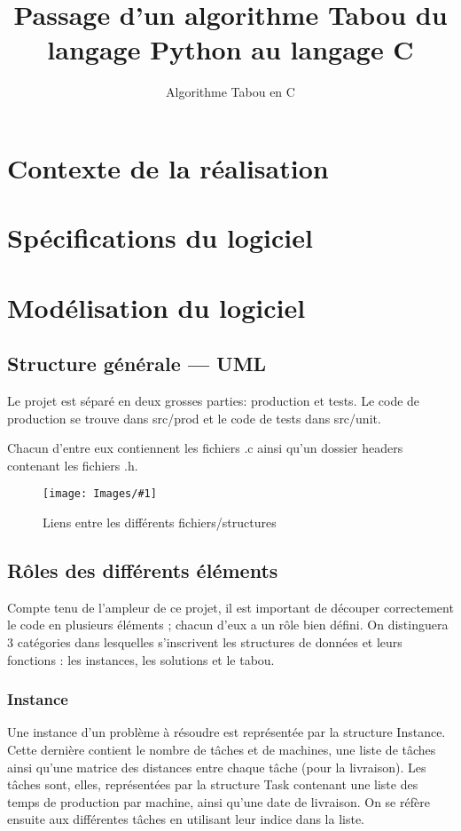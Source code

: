 \documentclass[hideweeklyreports]{polytech/polytech}
\title{Passage d'un algorithme Tabou du langage Python au langage C}
\subtitle{Algorithme Tabou en C}
\newcommand{\img}[3]{%
	\begin{figure}[H]
		\centering
   		\texttt{[image: Images/\#1]}
  	 	\caption{#2}
	\end{figure}
}
\begin{document}
	\chapter{Contexte de la réalisation} %
		
	\chapter{Spécifications du logiciel} %
		
	\chapter{Modélisation du logiciel} %
		\section{Structure générale — UML}
			Le projet est séparé en deux grosses parties: production et tests.
			Le code de production se trouve dans src/prod et le code de tests dans src/unit.
			
			Chacun d'entre eux contiennent les fichiers .c ainsi qu'un dossier headers contenant les fichiers .h.
			
			\img{UML.png}{Liens entre les différents fichiers/structures}{0.45}

		\section{Rôles des différents éléments} %
			Compte tenu de l'ampleur de ce projet, il est important de découper correctement le code en plusieurs éléments ; chacun d'eux a un rôle bien défini. On distinguera 3 catégories dans lesquelles s'inscrivent les structures de données et leurs fonctions : les instances, les solutions et le tabou.
			
			\subsection{Instance}
				Une instance d'un problème à résoudre est représentée par la structure Instance. Cette dernière contient le nombre de tâches et de machines, une liste de tâches ainsi qu'une matrice des distances entre chaque tâche (pour la livraison). Les tâches sont, elles, représentées par la structure Task contenant une liste des temps de production par machine, ainsi qu'une date de livraison. On se réfère ensuite aux différentes tâches en utilisant leur indice dans la liste.
				
\end{document}
